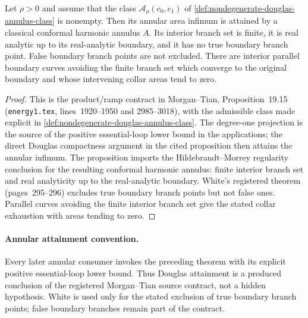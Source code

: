 \begin{theorem}
\label{thm:annular-douglas-minimizer}
\notready
Let $\rho>0$ and assume that the class
$\mathscr A_\rho(c_0,c_1)$ of
\ref{def:nondegenerate-douglas-annulus-class} is nonempty.  Then its annular
area infimum is attained by a classical conformal harmonic annulus $A$.  Its
interior branch set is finite, it is real analytic up to its real-analytic
boundary, and it has no true boundary branch point.  False boundary branch
points are not excluded.  There are interior parallel boundary curves
avoiding the finite branch set which converge to the original boundary and
whose intervening collar areas tend to zero.
\end{theorem}

\begin{proof}
This is the product/ramp contract in Morgan--Tian, Proposition~19.15
(\texttt{energy1.tex}, lines~1920--1950 and 2985--3018), with the admissible
class made explicit in \ref{def:nondegenerate-douglas-annulus-class}.  The
degree-one projection is the source of the positive essential-loop lower
bound in the applications; the direct Douglas compactness argument in the
cited proposition then attains the annular infimum.  The
proposition imports the Hildebrandt--Morrey regularity conclusion for the
resulting conformal harmonic annulus: finite interior branch set and real
analyticity up to the real-analytic boundary.  White's registered theorem
(pages~295--296) excludes true boundary branch points but not false ones.
Parallel curves avoiding the finite interior branch set give the stated
collar exhaustion with areas tending to zero.
\end{proof}

\paragraph{Annular attainment convention.}
Every later annular consumer invokes the preceding theorem with its explicit
positive essential-loop lower bound.  Thus Douglas attainment is a produced
conclusion of the registered Morgan--Tian source contract, not a hidden
hypothesis.  White is used only for the stated exclusion of true boundary
branch points; false boundary branches remain part of the contract.


